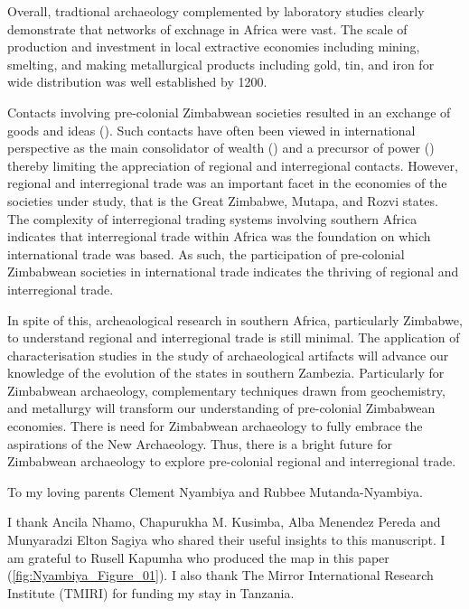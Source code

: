 Overall, tradtional archaeology complemented by laboratory studies clearly demonstrate that networks of exchnage in Africa were vast. The scale of production and investment in local extractive economies including mining, smelting, and making metallurgical products including gold, tin, and iron for wide distribution was well established by 1200\CE.


Contacts involving pre-colonial Zimbabwean societies resulted in an exchange of goods and ideas (\cite[][]{pikirayi2017}). Such contacts have often been viewed in international perspective as the main consolidator of wealth (\cite[][]{manyanga2006}) and a precursor of power (\cite[][]{kusimba2017}) thereby limiting the appreciation of regional and interregional contacts. However, regional and interregional trade was an important facet in the economies of the societies under study, that is the Great Zimbabwe, Mutapa, and Rozvi states. The complexity of interregional trading systems involving southern Africa indicates that interregional trade within Africa was the foundation on which international trade was based. As such, the participation of pre-colonial Zimbabwean societies in international trade indicates the thriving of regional and interregional trade.

In spite of this, archeaological research in southern Africa, particularly Zimbabwe, to understand regional and interregional trade is still minimal. The application of characterisation studies in the study of archaeological artifacts will advance our knowledge of the evolution of the states in southern Zambezia. Particularly for Zimbabwean archaeology, complementary techniques drawn from geochemistry, and metallurgy will transform our understanding of pre-colonial Zimbabwean economies. There is need for Zimbabwean archaeology to fully embrace the aspirations of the New Archaeology. Thus, there is a bright future for Zimbabwean archaeology to explore pre-colonial regional and interregional trade.

To my loving parents Clement Nyambiya and Rubbee Mutanda-Nyambiya.

I thank Ancila Nhamo, Chapurukha M. Kusimba, Alba Menendez Pereda and Munyaradzi Elton Sagiya who shared their useful insights to this manuscript. I am grateful to Rusell Kapumha who produced the map in this paper (\cref{fig:Nyambiya_Figure_01}). I also thank The Mirror International Research Institute (TMIRI) for funding my stay in Tanzania.

\IJSRAclosing%
